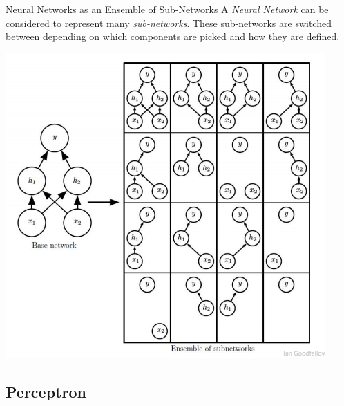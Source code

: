 \documentclass[11pt,a4paper]{article}
\begin{document}
  \begin{proposition}{Neural Networks as an Ensemble of Sub-Networks}
    A \textit{Neural Network} can be considered to represent many \textit{sub-networks}. These sub-networks are switched between depending on which components are picked and how they are defined.
    \begin{center}
      \includegraphics[width=.35\textwidth]{SubNeuralNetworks.PNG}
    \end{center}
  \end{proposition}

\subsection{Perceptron}
\end{document}
